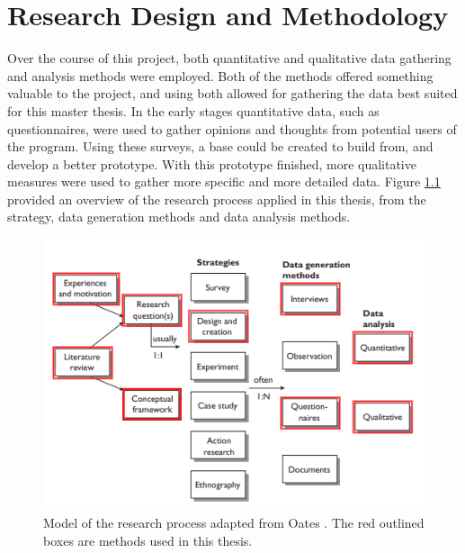 
\chapter{Research Design and Methodology}
Over the course of this project, both quantitative and qualitative data gathering and analysis methods were employed. Both of the methods offered something valuable to the project, and using both allowed for gathering the data best suited for this master thesis. In the early stages quantitative data, such as questionnaires, were used to gather opinions and thoughts from potential users of the program. Using these surveys, a base could be created to build from, and develop a better prototype. With this prototype finished, more qualitative measures were used to gather more specific and more detailed data. Figure \ref{fig:researchMethod} provided an overview of the research process applied in this thesis, from the strategy, data generation methods and data analysis methods.  

\begin{figure}[!ht]
     \centering
     \includegraphics[width=.8\textwidth]{./fig/researchMethodology/OatesResearch.png}
     \captionsetup{width=0.8\linewidth}
     \caption{Model of the research process adapted from Oates \cite{oates2005researching}. The red outlined boxes are methods used in this thesis.}
     \label{fig:researchMethod}
 \end{figure}

